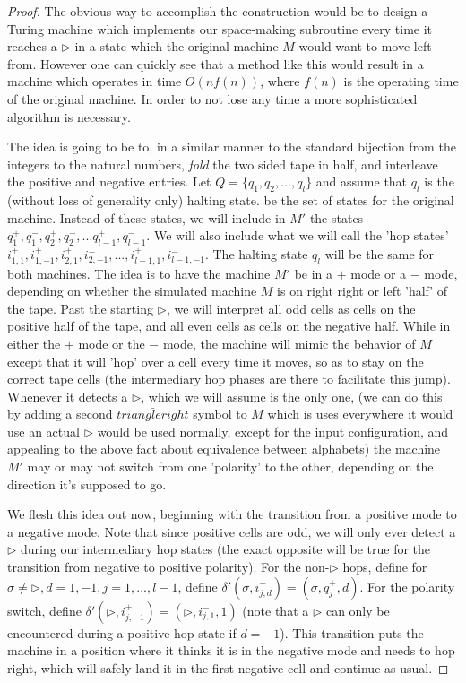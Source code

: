 \begin{proof}
	The obvious way to accomplish the construction would be to design a Turing machine which implements our space-making subroutine every time it reaches a $\triangleright$ in a state which the original machine $M$ would want to move left from. However one can quickly see that a method like this would result in a machine which operates in time $O(nf(n))$, where $f(n)$ is the operating time of the original machine. In order to not lose any time a more sophisticated algorithm is necessary. 

	The idea is going to be to, in a similar manner to the standard bijection from the integers to the natural numbers, \textit{fold} the two sided tape in half, and interleave the positive and negative entries. Let $Q = \{q_1,q_2,...,q_l\}$ and assume that $q_l$ is the (without loss of generality only) halting state. be the set of states for the original machine. Instead of these states, we will include in $M'$ the states $q_1^+,q_1^-,q_2^+,q_2^-,...q_{l-1}^+,q_{l-1}^-$. We will also include what we will call the 'hop states' $i_{1,1}^+,i_{1,-1}^+,i_{2,1}^+,i_{2,-1}^-,...,i_{l-1,1}^+,i_{l-1,-1}^-$. The halting state $q_l$ will be the same for both machines. The idea is to have the machine $M'$ be in a $+$ mode or a $-$ mode, depending on whether the simulated machine $M$ is on right right or left 'half' of the tape. Past the starting $\triangleright$, we will interpret all odd cells as cells on the positive half of the tape, and all even cells as cells on the negative half. While in either the $+$ mode or the $-$ mode, the machine will mimic the behavior of $M$ except that it will 'hop' over a cell every time it moves, so as to stay on the correct tape cells (the intermediary hop phases are there to facilitate this jump). Whenever it detects a $\triangleright$, which we will assume is the only one, (we can do this by adding a second $\bar{triangleright}$ symbol to $M$ which is uses everywhere it would use an actual $\triangleright$ would be used normally, except for the input configuration, and appealing to the above fact about equivalence between alphabets) the machine $M'$ may or may not switch from one 'polarity' to the other, depending on the direction it's supposed to go. 

	We flesh this idea out now, beginning with the transition from a positive mode to a negative mode. Note that since positive cells are odd, we will only ever detect a $\triangleright$ during our intermediary hop states (the exact opposite will be true for the transition from negative to positive polarity). For the non-$\triangleright$ hops, define for $\sigma \neq \triangleright, d = 1,-1,j =1,...,l-1$, define $\delta'(\sigma,i_{j,d}^+) = (\sigma,q_j^+,d)$. For the polarity switch, define $\delta'(\triangleright,i_{j,-1}^+) = (\triangleright,i_{j,1}^-,1)$ (note that a $\triangleright$ can only be encountered during a positive hop state if $d=-1$). This transition puts the machine in a position where it thinks it is in the negative mode and needs to hop right, which will safely land it in the first negative cell and continue as usual. 


\end{proof}
